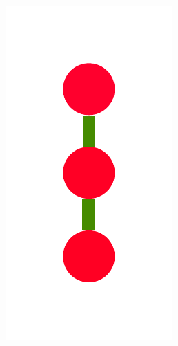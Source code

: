 \documentclass[a4paper,10pt]{article}
\begin{document}
\begin{figure}
{    \includegraphics[scale=.14]{../figures/vector/6-3-recursion-induced-3.pdf}
}
\end{figure}
\end{document}
